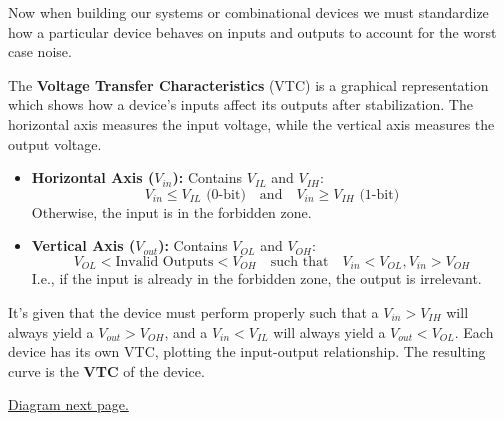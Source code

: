     \noindent
    Now when building our systems or combinational devices we must standardize how a particular device behaves on 
    inputs and outputs to account for the worst case noise.
    \begin{Def}

        \label{def:vtc}

        \noindent
        The \textbf{Voltage Transfer Characteristics} (VTC) is a graphical representation which shows how a device's inputs
        affect its outputs after stabilization. The horizontal axis measures the input voltage, while the vertical axis measures the output voltage.

        \begin{itemize}
            \item \textbf{Horizontal Axis ($V_{in}$):} Contains $V_{IL}$ and $V_{IH}$:
            \[V_{in} \leq V_{IL} \text{ (0-bit)} \quad \text{and} \quad V_{in} \geq V_{IH} \text{ (1-bit)}\]
            \noindent
            Otherwise, the input is in the forbidden zone.
            \item \textbf{Vertical Axis ($V_{out}$):} Contains $V_{OL}$ and $V_{OH}$:
            \[V_{OL} < \text{Invalid Outputs} < V_{OH} \quad \text{such that} \quad V_{in} < V_{OL}, V_{in} > V_{OH}\]
            \noindent
            I.e., if the input is already in the forbidden zone, the output is irrelevant.
        \end{itemize}

        \noindent
        It's given that the device must perform properly such that a $V_{in} > V_{IH}$ will always yield a $V_{out} > V_{OH}$, and a $V_{in} < V_{IL}$ will always yield a $V_{out} < V_{OL}$.
        Each device has its own VTC, plotting the input-output relationship. The resulting curve is the \textbf{VTC} of the device.
    \end{Def}

    \noindent
    \underline{Diagram next page.}

    \newpage

